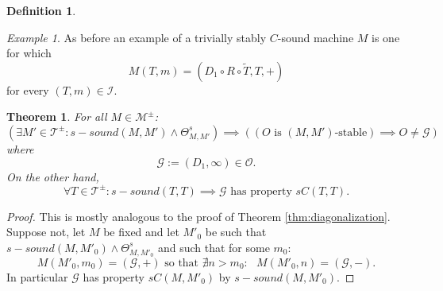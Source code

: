 \documentclass{amsart}  %
\numberwithin{equation}{section}
\newtheorem{theorem}[equation]{Theorem}
\newtheorem{definition}[equation]{Definition}
\theoremstyle{definition}
\theoremstyle{remark}
\newtheorem{example}[equation]{Example}
\begin{document}
{\begin{definition}
 \end{definition}
\begin{example} \label{example:strivial}
  As before an example of a trivially stably $C$-sound machine $M$ is one for which $$M (T,m) =  (D_1 \circ R \circ  \widetilde{T}, T,+) $$ for every $(T,m) \in \mathcal{I} $. 
\end {example}
\begin{theorem} \label{thm:stablediagonalization} For all $M \in \mathcal{M} ^{\pm} $:
\begin{equation*}
   (\exists M' \in \mathcal{T} ^{\pm}: s-sound ({M}, {M}') \land \Theta ^{s}  _{{M}, {M}'}) \implies ((\text{$O$ is $(M,M')$-stable}) \implies O \neq \mathcal{G})
\end{equation*}
where $$\mathcal{G}:=(D_1, \infty) \in \mathcal{O}.$$
On the other hand, 
\begin{equation} 
\forall T \in \mathcal{T} ^{\pm}: s-sound (T, T)  \implies \text{$\mathcal{G}$ has property $sC (T,T)$}.
\end{equation}
\end{theorem}
\begin{proof}  This is mostly analogous to the proof of Theorem \ref{thm:diagonalization}. Suppose not, let $M$ be fixed and let ${M}' _{0} $ be such that $s-sound ({M},{M}' _{0} ) \land \Theta ^{s}  _{{M}, {M}' _{0} }$ and such that for some $m _{0} $:
\begin{equation*} 
   M ({M}' _{0} ,m _{0} ) = (\mathcal{G}, +)  \text{ so that $\nexists n > m _{0}: $  } M ({M}' _{0},n ) = (\mathcal{G}, -).
\end{equation*}
In particular  $\mathcal{G}$ has property $sC (M,M' _{0} )$ by $s-sound (M,M' _{0} )$.


\end{proof}}
\end{document}
